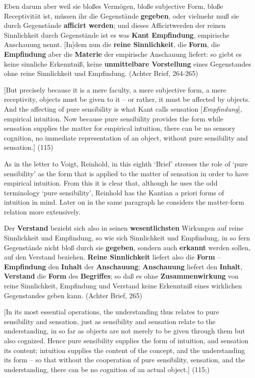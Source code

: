 Eben darum aber weil sie blo\ss{}es Verm\"{o}gen, blo\ss{}e subjective Form, blo\ss{}e Receptivit\"{a}t ist, m\"{u}ssen ihr die Gegenst\"{a}nde \textbf{gegeben}, oder vielmehr mu\ss{} sie durch Gegenst\"{a}nde \textbf{afficirt werden}; und dieses Afficirtwerden der reinen Sinnlichkeit durch Gegenst\"{a}nde ist es was \textbf{Kant Empfindung}, empirische Anschauung nennt. [In]dem nun die \textbf{reine Sinnlichkeit}, die \textbf{Form}, die \textbf{Empfindung }aber die \textbf{Materie} der empirische Anschauung liefert: so giebt es keine sinnliche Erkenntni\ss{}, keine \textbf{unmittelbare Vorstellung} eines Gegenstandes ohne reine Sinnlichkeit und Empfindung. (Achter Brief, 264{-}265)

[But precisely because it is a mere faculty, a mere subjective form, a mere receptivity, objects must be given to it {--} or rather, it must be affected by objects. And the affecting of pure sensibility is what Kant calls sensation [\textit{Empfindung}], empirical intuition. Now because pure sensibility provides the form while sensation supplies the matter for empirical intuition, there can be no sensory cognition, no immediate representation of an object, without pure sensibility and sensation.] (115)

As in the letter to Voigt, Reinhold, in this eighth `Brief' stresses the role of `pure sensibility' as the form that is applied to the matter of sensation in order to have empirical intuition. From this it is clear that, although he uses the odd terminology `pure sensibility', Reinhold has the Kantian a priori forms of intuition in mind. Later on in the same paragraph he considers the matter{-}form relation more extensively. 

Der \textbf{Verstand} bezieht sich also in seinen \textbf{wesentlichsten} Wirkungen auf reine Sinnlichkeit und Empfindung, so wie sich Sinnlichkeit und Empfindung, in so fern Gegenst\"{a}nde nicht blo\ss{} durch sie \textbf{gegeben}, sondern auch \textbf{erkannt} werden sollen, auf den Verstand beziehen. \textbf{Reine Sinnlichkeit} liefert also die \textbf{Form} {--} \textbf{Empfindung }den \textbf{Inhalt} der \textbf{Anschauung}; \textbf{Anschauung} liefert den \textbf{Inhalt}, \textbf{Verstand} die \textbf{Form} des \textbf{Begriffes}; so da\ss{} es ohne \textbf{Zusammenwirkung} von reine Sinnlichkeit, Empfindung und Verstand keine Erkenntni\ss{} eines wirklichen Gegenstandes geben kann. (Achter Brief, 265)

[In its most essential operations, the understanding thus relates to pure sensibility and sensation, just as sensibility and sensation relate to the understanding, in so far as objects are not merely to be given through them but also cognized. Hence pure sensibility supplies the form of intuition, and sensation its content; intuition supplies the content of the concept, and the understanding its form {--} so that without the cooperation of pure sensibility, sensation, and the understanding, there can be no cognition of an actual object.] (115;) 

